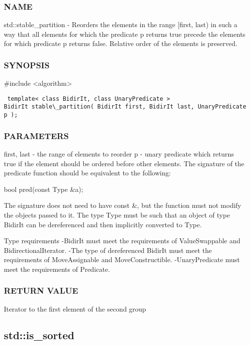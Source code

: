 \subsubsection{NAME}
std::stable\_partition - Reorders the elements in the range [first, last) in such a way that all elements for which the predicate p returns true precede the elements for which predicate p returns false. Relative order of the elements is preserved.

\subsubsection{SYNOPSIS}
\#include <algorithm>

\begin{lstlisting}
 template< class BidirIt, class UnaryPredicate >
BidirIt stable\_partition( BidirIt first, BidirIt last, UnaryPredicate p );
\end{lstlisting}

\subsubsection{PARAMETERS}
first, last - the range of elements to reorder
p - unary predicate which returns true  if the element should be ordered before other elements.
The signature of the predicate function should be equivalent to the following:

 bool pred(const Type \&a);

The signature does not need to have const \&, but the function must not modify the objects passed to it.
The type Type must be such that an object of type BidirIt can be dereferenced and then implicitly converted to Type.

 Type requirements
 -BidirIt must meet the requirements of ValueSwappable and BidirectionalIterator.
 -The type of dereferenced BidirIt must meet the requirements of MoveAssignable and MoveConstructible.
 -UnaryPredicate must meet the requirements of Predicate.

\subsubsection{RETURN VALUE}
Iterator to the first element of the second group



\subsection{std::is\_sorted}

